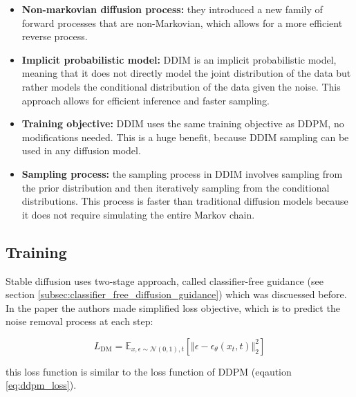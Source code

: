 \begin{itemize}
    \item \textbf{Non-markovian diffusion process:} they introduced a new family of forward processes that are non-Markovian, which allows for a more efficient reverse process.
    \item \textbf{Implicit probabilistic model:} DDIM is an implicit probabilistic model, meaning that it does not directly model the joint distribution of the data but rather models the conditional distribution of the data given the noise. This approach allows for efficient inference and faster sampling.
    \item \textbf{Training objective:} DDIM uses the same training objective as DDPM, no modifications needed. This is a huge benefit, because DDIM sampling can be used in any diffusion model.
    \item \textbf{Sampling process:} the sampling process in DDIM involves sampling from the prior distribution and then iteratively sampling from the conditional distributions. This process is faster than traditional diffusion models because it does not require simulating the entire Markov chain.
\end{itemize}
















\subsection{Training}

Stable diffusion uses two-stage approach, called classifier-free guidance (see section \ref{subsec:classifier_free_diffusion_guidance}) which was discuessed before. In the paper the authors made simplified loss objective, which is to predict the noise removal process at each step:

\[
    L_{\text{DM}} = \mathbb{E}_{x, \epsilon \sim \mathcal{N} (0, 1), t} \left[ \Vert \epsilon - \epsilon_\theta(x_t, t) \Vert _2^2 \right]
\]

this loss function is similar to the loss function of DDPM (eqaution \ref{eq:ddpm_loss}).













